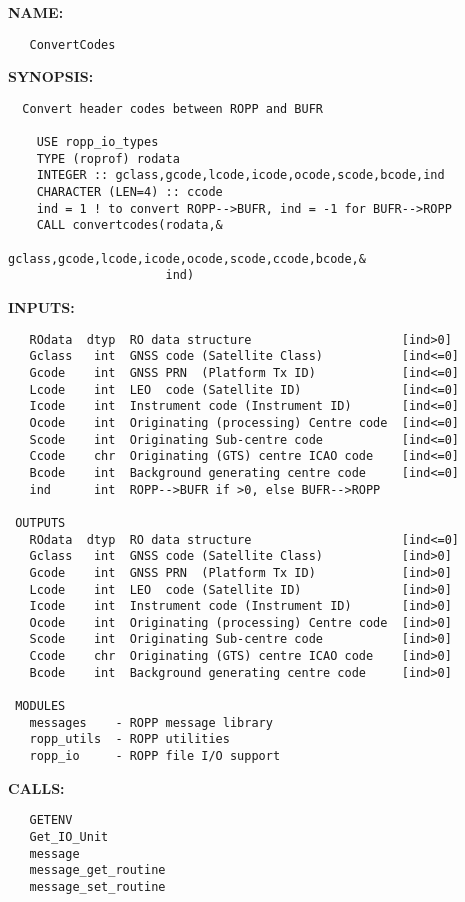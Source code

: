\label{ch:robo96}
\label{ch:ropp2bufr_ConvertCodes}
\textbf{NAME:}\hspace{0.08in}\begin{Verbatim}
   ConvertCodes
\end{Verbatim}
\textbf{SYNOPSIS:}\hspace{0.08in}\begin{Verbatim}
  Convert header codes between ROPP and BUFR

    USE ropp_io_types
    TYPE (roprof) rodata
    INTEGER :: gclass,gcode,lcode,icode,ocode,scode,bcode,ind
    CHARACTER (LEN=4) :: ccode
    ind = 1 ! to convert ROPP-->BUFR, ind = -1 for BUFR-->ROPP
    CALL convertcodes(rodata,&
                      gclass,gcode,lcode,icode,ocode,scode,ccode,bcode,&
                      ind)
\end{Verbatim}
\textbf{INPUTS:}\hspace{0.08in}\begin{Verbatim}
   ROdata  dtyp  RO data structure                     [ind>0]
   Gclass   int  GNSS code (Satellite Class)           [ind<=0]
   Gcode    int  GNSS PRN  (Platform Tx ID)            [ind<=0]
   Lcode    int  LEO  code (Satellite ID)              [ind<=0]
   Icode    int  Instrument code (Instrument ID)       [ind<=0]
   Ocode    int  Originating (processing) Centre code  [ind<=0]
   Scode    int  Originating Sub-centre code           [ind<=0]
   Ccode    chr  Originating (GTS) centre ICAO code    [ind<=0]
   Bcode    int  Background generating centre code     [ind<=0]
   ind      int  ROPP-->BUFR if >0, else BUFR-->ROPP

 OUTPUTS
   ROdata  dtyp  RO data structure                     [ind<=0]
   Gclass   int  GNSS code (Satellite Class)           [ind>0]
   Gcode    int  GNSS PRN  (Platform Tx ID)            [ind>0]
   Lcode    int  LEO  code (Satellite ID)              [ind>0]
   Icode    int  Instrument code (Instrument ID)       [ind>0]
   Ocode    int  Originating (processing) Centre code  [ind>0]
   Scode    int  Originating Sub-centre code           [ind>0]
   Ccode    chr  Originating (GTS) centre ICAO code    [ind>0]
   Bcode    int  Background generating centre code     [ind>0]

 MODULES
   messages    - ROPP message library
   ropp_utils  - ROPP utilities
   ropp_io     - ROPP file I/O support
\end{Verbatim}
\textbf{CALLS:}\hspace{0.08in}\begin{Verbatim}
   GETENV
   Get_IO_Unit
   message
   message_get_routine
   message_set_routine
\end{Verbatim}
